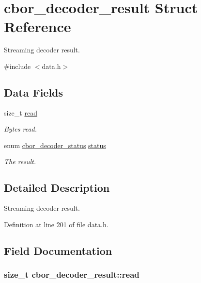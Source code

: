 \hypertarget{structcbor__decoder__result}{\section{cbor\-\_\-decoder\-\_\-result Struct Reference}
\label{structcbor__decoder__result}
}


Streaming decoder result.  




{\ttfamily \#include $<$data.\-h$>$}

\subsection*{Data Fields}
\begin{DoxyCompactItemize}
\item 
size\-\_\-t \hyperlink{structcbor__decoder__result_a39828fd8d825610cda67d9738d2d5c23}{read}
\begin{DoxyCompactList}\small\item\em Bytes read. \end{DoxyCompactList}\item 
enum \hyperlink{data_8h_abfc88122444f085a1a3fee01687329fd}{cbor\-\_\-decoder\-\_\-status} \hyperlink{structcbor__decoder__result_a1b775085d3696356c9ca284ffd9a264d}{status}
\begin{DoxyCompactList}\small\item\em The result. \end{DoxyCompactList}\end{DoxyCompactItemize}


\subsection{Detailed Description}
Streaming decoder result. 

Definition at line 201 of file data.\-h.



\subsection{Field Documentation}
\hypertarget{structcbor__decoder__result_a39828fd8d825610cda67d9738d2d5c23}{
\subsubsection[{read}]{\setlength{\rightskip}{0pt plus 5cm}size\-\_\-t cbor\-\_\-decoder\-\_\-result\-::read}}\label{structcbor__decoder__result_a39828fd8d825610cda67d9738d2d5c23}


